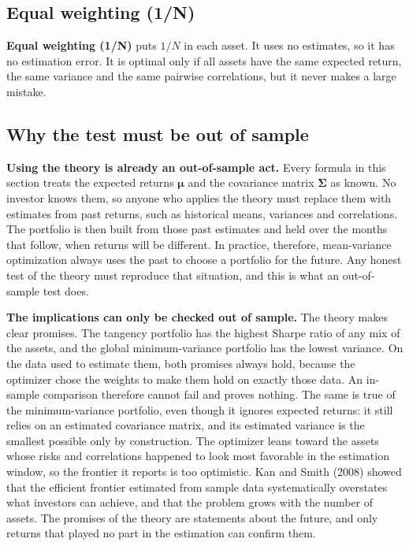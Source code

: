 \subsection{Equal weighting (1/N)}
\label{sec:12-equal}

\textbf{Equal weighting (1/N)} puts $1/N$ in each asset. It uses no estimates, so it has no estimation error. It is optimal only if all assets have the same expected return, the same variance and the same pairwise correlations, but it never makes a large mistake.

\subsection{Why the test must be out of sample}
\label{sec:12-oos}

\textbf{Using the theory is already an out-of-sample act.} Every formula in this section treats the expected returns $\boldsymbol{\mu}$ and the covariance matrix $\boldsymbol{\Sigma}$ as known. No investor knows them, so anyone who applies the theory must replace them with estimates from past returns, such as historical means, variances and correlations. The portfolio is then built from those past estimates and held over the months that follow, when returns will be different. In practice, therefore, mean-variance optimization always uses the past to choose a portfolio for the future. Any honest test of the theory must reproduce that situation, and this is what an out-of-sample test does.

\textbf{The implications can only be checked out of sample.} The theory makes clear promises. The tangency portfolio has the highest Sharpe ratio of any mix of the assets, and the global minimum-variance portfolio has the lowest variance. On the data used to estimate them, both promises always hold, because the optimizer chose the weights to make them hold on exactly those data. An in-sample comparison therefore cannot fail and proves nothing. The same is true of the minimum-variance portfolio, even though it ignores expected returns: it still relies on an estimated covariance matrix, and its estimated variance is the smallest possible only by construction. The optimizer leans toward the assets whose risks and correlations happened to look most favorable in the estimation window, so the frontier it reports is too optimistic. Kan and Smith (2008) showed that the efficient frontier estimated from sample data systematically overstates what investors can achieve, and that the problem grows with the number of assets. The promises of the theory are statements about the future, and only returns that played no part in the estimation can confirm them.

